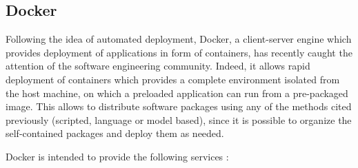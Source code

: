 

\subsection{Docker}
Following the idea of automated deployment, Docker, a client-server engine which provides deployment of applications in form of containers, has recently caught the attention of the software engineering community.
Indeed, it allows rapid deployment of containers which provides a complete environment isolated from the host machine, on which a preloaded application can run from a pre-packaged image.
This allows to distribute software packages using any of the methods cited previously (scripted, language or model based), since it is possible to organize the self-contained packages and deploy them as needed.

Docker is intended to provide the following services \cite{turnbull2014docker}:

